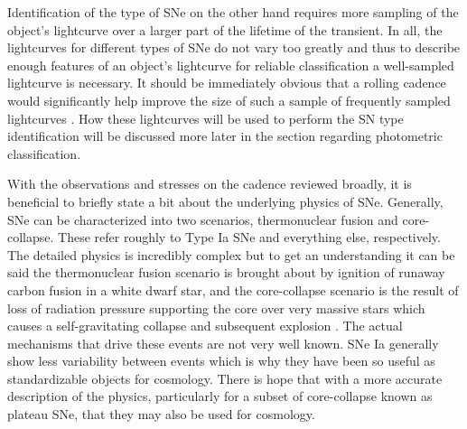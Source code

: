 \documentclass[12pt]{article}
\begin{document}
Identification of the type of SNe on the other hand requires more sampling of the object's lightcurve over a larger part of the lifetime of the transient. In all, the lightcurves for different types of SNe do not vary too greatly and thus to describe enough features of an object's lightcurve for reliable classification a well-sampled lightcurve is necessary. It should be immediately obvious that a rolling cadence would significantly help improve the size of such a sample of frequently sampled lightcurves \citep{LSSTScienceCollaboration2017}. How these lightcurves will be used to perform the SN type identification will be discussed more later in the section regarding photometric classification. \par
With the observations and stresses on the cadence reviewed broadly, it is beneficial to briefly state a bit about the underlying physics of SNe. Generally, SNe can be characterized into two scenarios, thermonuclear fusion and core-collapse. These refer roughly to Type Ia SNe and everything else, respectively. The detailed physics is incredibly complex but to get an understanding it can be said the thermonuclear fusion scenario is brought about by ignition of runaway carbon fusion in a white dwarf star, and the core-collapse scenario is the result of loss of radiation pressure supporting the core over very massive stars which causes a self-gravitating collapse and subsequent explosion \citep{Heger2002,Mazzali2007}. The actual mechanisms that drive these events are not very well known. SNe Ia generally show less variability between events which is why they have been so useful as standardizable objects for cosmology. There is hope that with a more accurate description of the physics, particularly for a subset of core-collapse known as plateau SNe, that they may also be used for cosmology. \par
\end{document}
